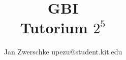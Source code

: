 \title[Grundbegriffe der Informatik]{GBI\\Tutorium $2^5$}
\date{\tutdate}
\subtitle{\tutTitle}
\author{Jan Zwerschke upezu@student.kit.edu}

\institute{}


%


%

